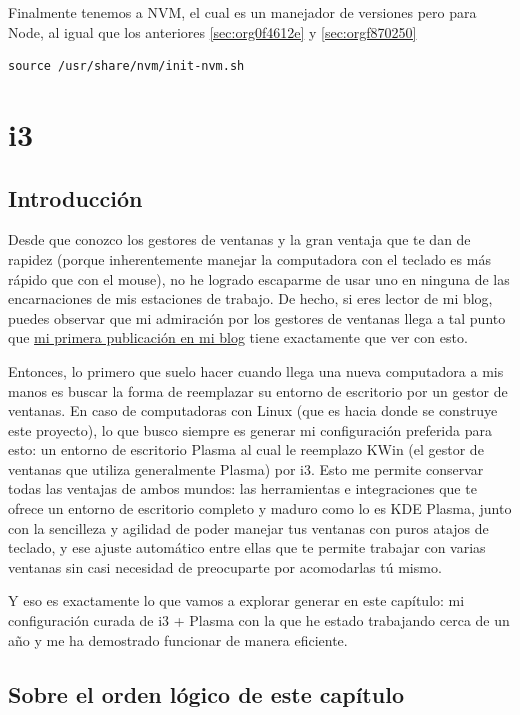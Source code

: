 \documentclass[11pt]{article}
\begin{document}
Finalmente tenemos a NVM, el cual es un manejador de versiones pero para Node, al igual que los anteriores \ref{sec:org0f4612e}
y \ref{sec:orgf870250}

\begin{verbatim}
source /usr/share/nvm/init-nvm.sh
\end{verbatim}
\section{i3}
\label{sec:orgb4b5bca}

\subsection{Introducción}
\label{sec:org23aa1bc}

Desde que conozco los gestores de ventanas y la gran ventaja que te dan de rapidez (porque inherentemente manejar la computadora con el teclado es más rápido que con el mouse), no he logrado escaparme de usar uno en ninguna de las encarnaciones de mis estaciones de trabajo. De hecho, si eres lector de mi blog, puedes observar que mi admiración por los gestores de ventanas llega a tal punto que \href{https://isaacnietog.github.io/blog/250114gestorDeVentanas/}{mi primera publicación en mi blog} tiene exactamente que ver con esto.

Entonces, lo primero que suelo hacer cuando llega una nueva computadora a mis manos es buscar la forma de reemplazar su entorno de escritorio por un gestor de ventanas. En caso de computadoras con Linux (que es hacia donde se construye este proyecto), lo que busco siempre es generar mi configuración preferida para esto: un entorno de escritorio Plasma al cual le reemplazo KWin (el gestor de ventanas que utiliza generalmente Plasma) por i3. Esto me permite conservar todas las ventajas de ambos mundos: las herramientas e integraciones que te ofrece un entorno de escritorio completo y maduro como lo es KDE Plasma, junto con la sencilleza y agilidad de poder manejar tus ventanas con puros atajos de teclado, y ese ajuste automático entre ellas que te permite trabajar con varias ventanas sin casi necesidad de preocuparte por acomodarlas tú mismo.

Y eso es exactamente lo que vamos a explorar generar en este capítulo: mi configuración curada de i3 + Plasma con la que he estado trabajando cerca de un año y me ha demostrado funcionar de manera eficiente.
\subsection{Sobre el orden lógico de este capítulo}
\label{sec:orgc4b0101}
\end{document}
